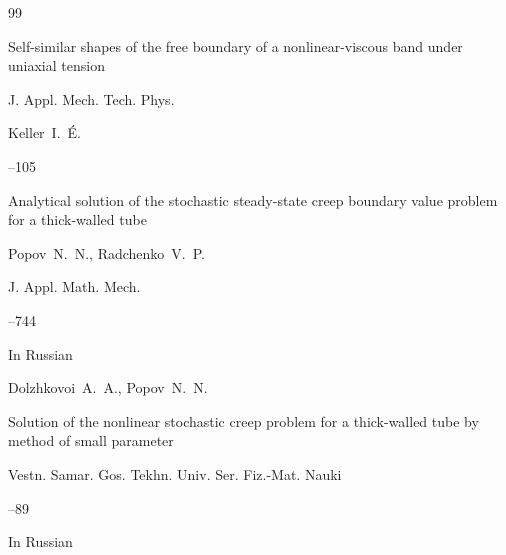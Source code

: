 \begin{thebibliography}{99}







\paper Self-similar shapes of the free boundary of a nonlinear-viscous band under uniaxial tension

\jour J. Appl. Mech. Tech. Phys.

\by Keller~I.~\'E.




--105







\paper Analytical solution of the stochastic steady-state creep boundary value problem for a thick-walled tube

\by Popov~N.~N., Radchenko~V.~P.

\jour J. Appl. Math. Mech.




–744






\lang In Russian

\by  Dolzhkovoi~A.~A., Popov~N.~N.

\paper Solution of the nonlinear stochastic creep problem for a thick-walled tube by method of small parameter

\jour Vestn. Samar. Gos. Tekhn. Univ. Ser. Fiz.-Mat. Nauki



--89







\lang In Russian


\end{thebibliography}
